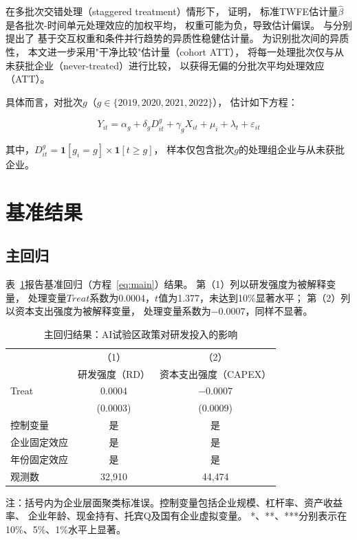 \documentclass[12pt, a4paper]{article}
\begin{document}
在多批次交错处理（staggered treatment）情形下，
\textcite{goodman2021difference}证明，
标准TWFE估计量$\hat{\beta}$是各批次-时间单元处理效应的加权平均，
权重可能为负，导致估计偏误。
\textcite{sun2021estimating}与\textcite{callaway2021difference}分别提出了
基于交互权重和条件并行趋势的异质性稳健估计量。
为识别批次间的异质性，
本文进一步采用"干净比较"估计量（cohort ATT），
将每一处理批次仅与从未获批企业（never-treated）进行比较，
以获得无偏的分批次平均处理效应（ATT）\parencite{callaway2021difference,sun2021estimating}。

具体而言，对批次$g$（$g \in \{2019, 2020, 2021, 2022\}$），
估计如下方程：

\begin{equation}
Y_{it} = \alpha_g + \delta_g D_{it}^g + \gamma_g X_{it}
         + \mu_i + \lambda_t + \varepsilon_{it}
\label{eq:cohort}
\end{equation}

其中，$D_{it}^g = \mathbf{1}[g_i = g] \times \mathbf{1}[t \geq g]$，
样本仅包含批次$g$的处理组企业与从未获批企业。

\section{基准结果}
\label{sec:results}

\subsection{主回归}

表~\ref{tab:main}报告基准回归（方程~\ref{eq:main}）结果。
第（1）列以研发强度为被解释变量，
处理变量$\mathit{Treat}$系数为0.0004，$t$值为1.377，未达到10\%显著水平；
第（2）列以资本支出强度为被解释变量，
处理变量系数为$-0.0007$，同样不显著。

\begin{table}[htbp]
\centering
\caption{主回归结果：AI试验区政策对研发投入的影响}
\label{tab:main}
\begin{threeparttable}
\begin{tabular}{lcc}
\toprule
 & \multicolumn{1}{c}{（1）} & \multicolumn{1}{c}{（2）} \\
 & 研发强度（RD） & 资本支出强度（CAPEX） \\
\midrule
Treat & 0.0004 & $-$0.0007 \\
      & (0.0003) & (0.0009) \\
\midrule
控制变量      & 是 & 是 \\
企业固定效应  & 是 & 是 \\
年份固定效应  & 是 & 是 \\
观测数        & 32,910 & 44,474 \\
\bottomrule
\end{tabular}
\begin{tablenotes}
\small\kaiti
\item 注：括号内为企业层面聚类标准误。控制变量包括企业规模、杠杆率、资产收益率、
企业年龄、现金持有、托宾Q及国有企业虚拟变量。
*、**、***分别表示在10\%、5\%、1\%水平上显著。
\end{tablenotes}
\end{threeparttable}
\end{table}
\end{document}
